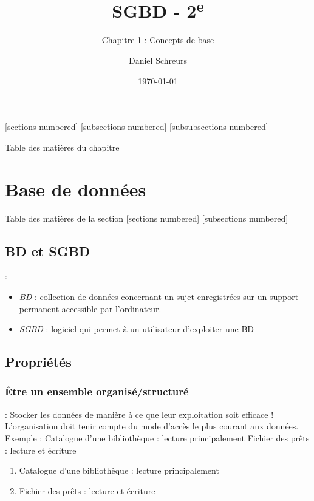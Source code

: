\documentclass[10pt]{beamer}
\title{SGBD - 2\textsuperscript{e}}
\subtitle{Chapitre 1 : Concepts de base}
\date{\today}
\author{Daniel Schreurs}
\institute{Haute École de la Province de Liège}
\begin{document}
\maketitle

[sections numbered]
[subsections numbered]
[subsubsections numbered]
\begin{frame}[allowframebreaks]{Table des matières du chapitre}
    \tableofcontents[subsectionstyle=show/show/hide,subsubsectionstyle=show/show/hide,]
\end{frame}

\section{Base de données}
\begin{frame}{Table des matières de la section}
    [sections numbered]
    [subsections numbered]
    \tableofcontents[currentsection,currentsubsection,
        hideothersubsections,
        sectionstyle=show/shaded,
    ]
\end{frame}

\subsection{BD et SGBD}
\begin{frame}{\secname : \subsecname}
    \begin{itemize}
        \item \emph{BD} : collection de données concernant un sujet enregistrées sur un support permanent accessible par l’ordinateur.
        \item \emph{SGBD} : logiciel qui permet à un utilisateur d’exploiter une BD
    \end{itemize}
\end{frame}

\subsection{Propriétés}
\tocsss

\subsubsection{Être un ensemble organisé/structuré}
\begin{frame}{\subsecname : \subsubsecname}
    Stocker les données de manière à ce que leur exploitation soit efficace !
    L’organisation doit tenir compte du mode d’accès le plus courant aux données.
    Exemple :
    Catalogue d’une bibliothèque : lecture principalement
    Fichier des prêts : lecture et écriture
    \begin{enumerate}
        \item Catalogue d’une bibliothèque : lecture principalement
        \item Fichier des prêts : lecture et écriture
    \end{enumerate}
\end{frame}
\end{document}
